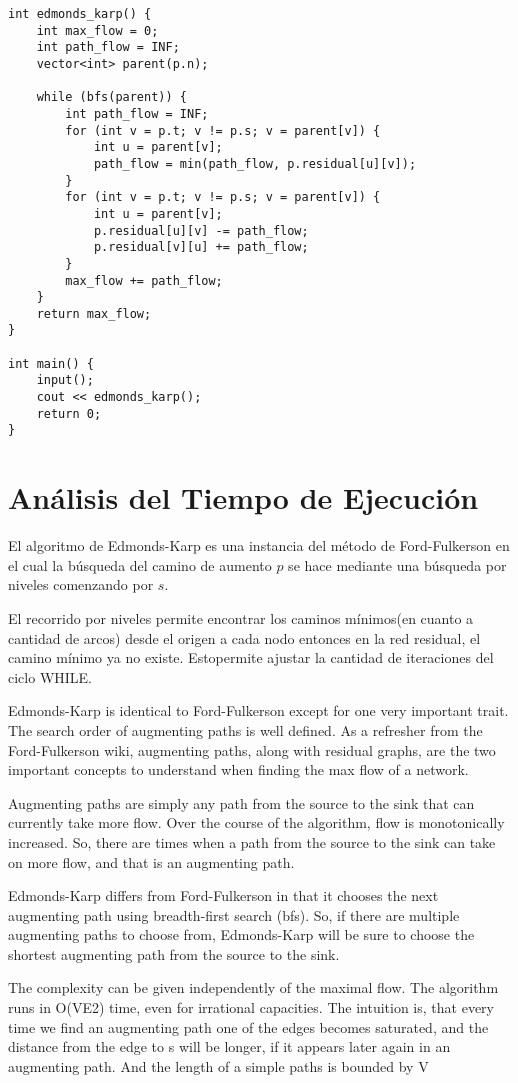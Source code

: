 \documentclass[12pt, a4paper]{article}
\begin{document}
\begin{verbatim}
int edmonds_karp() {
    int max_flow = 0;
    int path_flow = INF;
    vector<int> parent(p.n);

    while (bfs(parent)) {
		int path_flow = INF;
		for (int v = p.t; v != p.s; v = parent[v]) {
			int u = parent[v];
			path_flow = min(path_flow, p.residual[u][v]);
		}
        for (int v = p.t; v != p.s; v = parent[v]) {
            int u = parent[v];
            p.residual[u][v] -= path_flow;
            p.residual[v][u] += path_flow;
        }
        max_flow += path_flow;
    }
    return max_flow;
}

int main() {
    input();
    cout << edmonds_karp();
    return 0;
}
\end{verbatim}

\section{Análisis del Tiempo de Ejecución}

El algoritmo de Edmonds-Karp es una instancia del método de Ford-Fulkerson en el cual la búsqueda del camino de aumento $p$ se hace mediante una búsqueda por niveles comenzando por $s$.

El recorrido por niveles permite encontrar los caminos mínimos(en cuanto a cantidad de arcos) desde el origen a cada nodo entonces en la red residual, el camino mínimo ya no existe. Estopermite ajustar la cantidad de iteraciones del ciclo WHILE.

Edmonds-Karp is identical to Ford-Fulkerson except for one very important trait. 
The search order of augmenting paths is well defined. As a refresher from the Ford-Fulkerson wiki, augmenting paths, along with residual graphs, are the two important concepts to understand when finding the max flow of a network.

Augmenting paths are simply any path from the source to the sink that can currently take more flow. 
Over the course of the algorithm, flow is monotonically increased. 
So, there are times when a path from the source to the sink can take on more flow, and that is an augmenting path.

Edmonds-Karp differs from Ford-Fulkerson in that it chooses the next augmenting path using breadth-first search (bfs). 
So, if there are multiple augmenting paths to choose from, Edmonds-Karp will be sure to choose the shortest augmenting path from the source to the sink.

The complexity can be given independently of the maximal flow. The algorithm runs in O(VE2) time, even for irrational capacities. 
The intuition is, that every time we find an augmenting path one of the edges becomes saturated, and the distance from the edge to s will be longer, if it appears later again in an augmenting path. 
And the length of a simple paths is bounded by V
\end{document}
